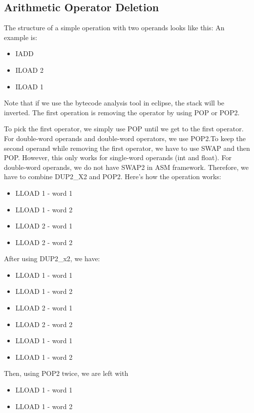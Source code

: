 \subsection{Arithmetic Operator Deletion}
The structure of a simple operation with two operands looks like this:
An example is: 
\begin{itemize}
\item IADD
\item ILOAD 2
\item ILOAD 1
\end{itemize}

Note that if we use the bytecode analysis tool in eclipse, the stack will be inverted. The first operation is removing the operator by using POP or POP2. 

To pick the first operator, we simply use POP until we get to the first operator. For double-word operands and double-word operators, we use POP2.To keep the second operand while removing the first operator, we have to use SWAP and then POP. However, this only works for single-word operands (int and float). For double-word operands, we do not have SWAP2 in ASM framework. Therefore, we have to combine DUP2\_X2 and POP2. Here's how the operation works:

\begin{itemize}
\item LLOAD 1 - word 1
\item LLOAD 1 - word 2
\item LLOAD 2 - word 1
\item LLOAD 2 - word 2
\end{itemize}

After using DUP2\_x2, we have:
\begin{itemize}
\item LLOAD 1 - word 1
\item LLOAD 1 - word 2
\item LLOAD 2 - word 1
\item LLOAD 2 - word 2
\item LLOAD 1 - word 1
\item LLOAD 1 - word 2
\end{itemize}

Then, using POP2 twice, we are left with 
\begin{itemize}
\item LLOAD 1 - word 1
\item LLOAD 1 - word 2
\end{itemize}